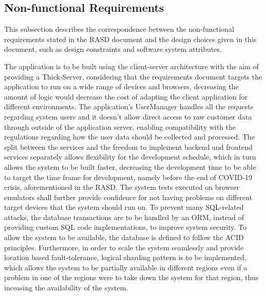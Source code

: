 \subsection{Non-functional Requirements}

This subsection describes the correspondence between the non-functional requirements stated in the RASD document and the design choices given in this document, such as design constraints and software system attributes.

The application is to be built using the client-server architecture with the aim of providing a Thick-Server, considering that the requirements document targets the application to run on a wide range of devices and browsers, decreasing the amount of logic would decrease the cost of adapting the client application for different environments.
The application's UserManager handles all the requests regarding system users and it doesn't allow direct access to raw customer data through outside of the application server, enabling compatibility with the regulations regarding how the user data should be collected and processed.
The split between the services and the freedom to implement backend and frontend services separately allows flexibility for the development schedule, which in turn allows the system to be built faster, decreasing the development time to be able to target the time frame for development, namely before the end of COVID-19 crisis, aforementioned in the RASD.
The system tests executed on browser emulators shall further provide confidence for not having problems on different target devices that the system should run on.
To prevent many SQL-related attacks, the database transactions are to be handled by an ORM, instead of providing custom SQL code implementations, to improve system security.
To allow the system to be available, the database is defined to follow the ACID principles.
Furthermore, in order to scale the system seamlessly and provide location based fault-tolerance, logical sharding pattern is to be implemented, which allows the system to be partially available in different regions even if a problem in one of the regions were to take down the system for that region, thus inceasing the availability of the system.



